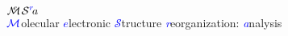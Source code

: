 \documentclass[10pt]{article}
\begin{document}
\begin{center}
\huge{\textcolor{blue}{$\displaystyle{\mathcal{M} \!\!\!\!^e\,\,\mathcal{S}^{\scriptsize{\textcolor{blue}{r}}}\! a}$}}
 \\ \normalsize{$\textcolor{blue}{\mathcal{M}}$olecular \textcolor{blue}{$e$}lectronic \textcolor{blue}{$\mathcal{S}$}tructure \textcolor{blue}{{\textit{r}}}eorganization:  \textcolor{blue}{\textit{a}}nalysis}
\end{center}
\end{document}
